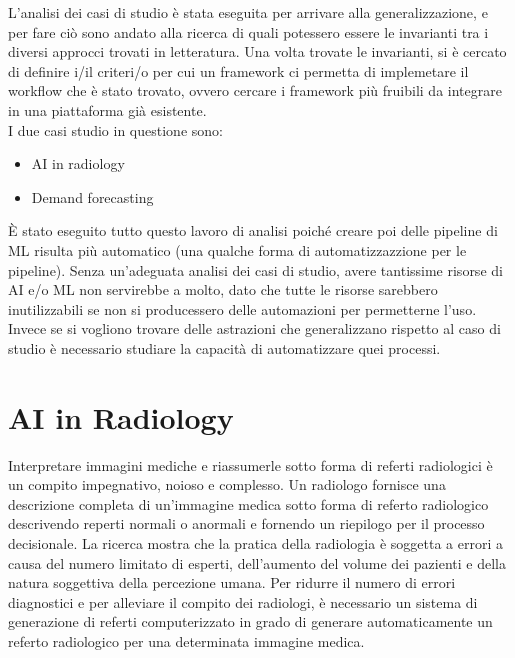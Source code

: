 \documentclass[12pt,a4paper]{report}
\begin{document}
L'analisi dei casi di studio è stata eseguita per arrivare alla generalizzazione, e per fare ciò sono andato alla ricerca di quali potessero essere le invarianti tra i diversi approcci trovati in letteratura. Una volta trovate le invarianti, si è cercato di definire i/il criteri/o per cui un framework ci permetta di implemetare il workflow che è stato trovato, ovvero cercare i framework più fruibili da integrare in una piattaforma già esistente.\\
I due casi studio in questione sono:
\begin{itemize}
    \item AI in radiology
    \item Demand forecasting
\end{itemize}

È stato eseguito tutto questo lavoro di analisi poiché creare poi delle pipeline di ML risulta più automatico (una qualche forma di automatizzazzione per le pipeline). Senza un'adeguata analisi dei casi di studio, avere tantissime risorse di AI e/o ML non servirebbe a molto, dato che tutte le risorse sarebbero inutilizzabili se non si producessero delle automazioni per permetterne l'uso. Invece se si vogliono trovare delle astrazioni che generalizzano rispetto al caso di studio è necessario studiare la capacità di automatizzare quei processi.\\

\chapter{AI in Radiology}
Interpretare immagini mediche e riassumerle sotto forma di referti radiologici è un compito impegnativo, noioso e complesso. Un radiologo fornisce una descrizione completa di un'immagine medica sotto forma di referto radiologico descrivendo reperti normali o anormali e fornendo un riepilogo per il processo decisionale. La ricerca mostra che la pratica della radiologia è soggetta a errori a causa del numero limitato di esperti, dell'aumento del volume dei pazienti e della natura soggettiva della percezione umana. Per ridurre il numero di errori diagnostici e per alleviare il compito dei radiologi, è necessario un sistema di generazione di referti computerizzato in grado di generare automaticamente un referto radiologico per una determinata immagine medica.
\end{document}

